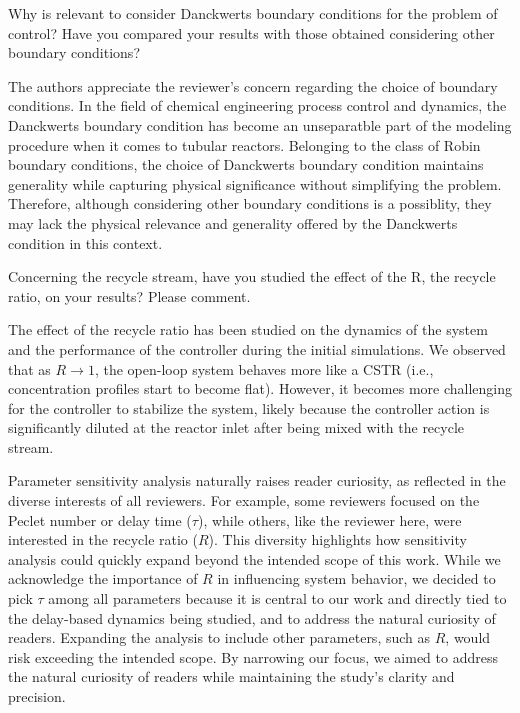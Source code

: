 \documentclass[11pt,answers]{exam}
\begin{document}
\begin{questions}

    \question Why is relevant to consider Danckwerts boundary conditions for the problem of control? Have you compared your results with those obtained considering other boundary conditions?

    \begin{solutionorbox} \label{comment:2_1}
        The authors appreciate the reviewer's concern regarding the choice of boundary conditions. In the field of chemical engineering process control and dynamics, the Danckwerts boundary condition has become an unseparatble part of the modeling procedure when it comes to tubular reactors. Belonging to the class of Robin boundary conditions, the choice of Danckwerts boundary condition maintains generality while capturing physical significance without simplifying the problem. Therefore, although considering other boundary conditions is a possiblity, they may lack the physical relevance and generality offered by the Danckwerts condition in this context.
    \end{solutionorbox}


    \question Concerning the recycle stream, have you studied the effect of the R, the recycle ratio, on your results? Please comment.

    \begin{solutionorbox} \label{comment:2_2}
        The effect of the recycle ratio has been studied on the dynamics of the system and the performance of the controller during the initial simulations. We observed that as \( R \to 1 \), the open-loop system behaves more like a CSTR (i.e., concentration profiles start to become flat). However, it becomes more challenging for the controller to stabilize the system, likely because the controller action is significantly diluted at the reactor inlet after being mixed with the recycle stream.

        Parameter sensitivity analysis naturally raises reader curiosity, as reflected in the diverse interests of all reviewers. For example, some reviewers focused on the Peclet number or delay time (\( \tau \)), while others, like the reviewer here, were interested in the recycle ratio (\( R \)). This diversity highlights how sensitivity analysis could quickly expand beyond the intended scope of this work. While we acknowledge the importance of \( R \) in influencing system behavior, we decided to pick \( \tau \) among all parameters because it is central to our work and directly tied to the delay-based dynamics being studied, and to address the natural curiosity of readers. Expanding the analysis to include other parameters, such as \( R \), would risk exceeding the intended scope. By narrowing our focus, we aimed to address the natural curiosity of readers while maintaining the study's clarity and precision. 
        

\end{solutionorbox}
\end{questions}
\end{document}
